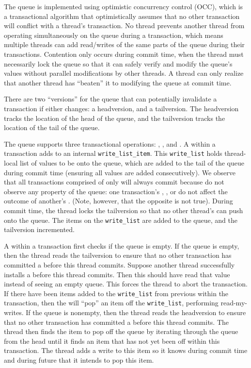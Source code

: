 The queue is implemented using optimistic concurrency control (OCC), which is a transactional algorithm that optimistically assumes that no other transaction will conflict with a thread’s transaction. No thread prevents another thread from operating simultaneously on the queue during a transaction, which means multiple threads can add read/writes of the same parts of the queue during their transactions. Contention only occurs during commit time, when the thread must necessarily lock the queue so that it can safely verify and modify the queue’s values without parallel modifications by other threads. A thread can only realize that another thread has “beaten” it to modifying the queue at commit time.

There are two “versions” for the queue that can potentially invalidate a transaction if either changes: a headversion, and a tailversion. The headversion tracks the location of the head of the queue, and the tailversion tracks the location of the tail of the queue.

The queue supports three transactional operations: \push, \pop, and \front. A \push within a transaction adds to an internal \texttt{write\_list\_item}. This \texttt{write\_list} holds thread-local list of values to be \pushed onto the queue, which are added to the tail of the queue during commit time (ensuring all values are added consecutively). We observe that all transactions comprised of only \pushes will always commit because \pushes do not observe any property of the queue: one transaction’s \pushes, \fronts, or \pops do not affect the outcome of another’s \pushes. (Note, however, that the opposite is not true). During commit time, the thread locks the tailversion so that no other thread’s \push can push onto the queue. The items on the \texttt{write\_list} are added to the queue, and the tailversion incremented.

A \pop within a transaction first checks if the queue is empty. If the queue is empty, then the thread reads the tailversion to ensure that no other transaction has committed a \push before this thread commits. Suppose another thread successfully installs a \push before this thread commits. Then this \pop should have read that \pushed value instead of seeing an empty queue. This forces the thread to abort the transaction. If there have been items added to the \texttt{write\_list} from previous \pushes within the transaction, then the \pop will “pop” an item off the \texttt{write\_list}, performing read-my-writes. If the queue is nonempty, then the thread reads the headversion to ensure that no other transaction has committed a \pop before this thread commits. The thread then finds the item to pop off the queue by iterating through the queue from the head until it finds an item that has not yet been \popped off within this transaction. The thread adds a write to this item so it knows during commit time and during future \pops that it intends to pop this item.

